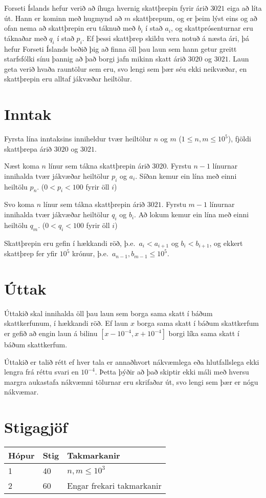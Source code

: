 Forseti Íslands hefur verið að íhuga hvernig skattþrepin fyrir árið $3021$ eiga
að líta út. Hann er kominn með hugmynd að $m$ skattþrepum, og er þeim lýst eins
og að ofan nema að skattþrepin eru táknuð með $b_i$ í stað $a_i$, og
skattprósenturnar eru táknaðar með $q_i$ í stað $p_i$. Ef þessi skattþrep
skildu vera notuð á næsta ári, þá hefur Forseti Íslands beðið þig að finna öll
þau laun sem hann getur greitt starfsfólki sínu þannig að það borgi jafn mikinn
skatt árið $3020$ og $3021$. Laun geta verið hvaða rauntölur sem eru, svo lengi
sem þær séu ekki neikvæðar, en skattþrepin eru alltaf jákvæðar heiltölur.

\section*{Inntak}
Fyrsta lína inntaksins inniheldur tvær heiltölur $n$ og $m$ ($1 \leq n,m \leq
10^5$), fjöldi skattþrepa árið $3020$ og $3021$.

Næst koma $n$ línur sem tákna skattþrepin árið $3020$.
Fyrstu $n - 1$ línurnar innihalda tvær jákvæðar heiltölur $p_i$ og $a_i$.
Síðan kemur ein lína með einni heiltölu $p_n$. ($0 < p_i < 100$ fyrir öll $i$)

Svo koma $n$ línur sem tákna skattþrepin árið $3021$.
Fyrstu $m - 1$ línurnar innihalda tvær jákvæðar heiltölur $q_i$ og $b_i$.
Að lokum kemur ein lína með einni heiltölu $q_m$. ($0 < q_i < 100$ fyrir öll $i$)

Skattþrepin eru gefin í hækkandi röð, þ.e.\ $a_i < a_{i + 1}$ og $b_i < b_{i + 1}$,
og ekkert skattþrep fer yfir $10^5$ krónur, þ.e.\ $a_{n-1}, b_{m-1} \leq 10^5$.

\section*{Úttak}
Úttakið skal innihalda öll þau laun sem borga sama skatt í báðum skattkerfunum, í hækkandi röð.
Ef laun $x$ borga sama skatt í báðum skattkerfum er gefið að engin laun á bilinu $[x - 10^{-4}, x + 10^{-4}]$ borgi líka sama skatt í báðum skattkerfum.

Úttakið er talið rétt ef hver tala er annaðhvort nákvæmlega eða hlutfallslega ekki 
lengra frá réttu svari en $10^{-4}$. Þetta þýðir að það skiptir ekki máli með hversu 
margra aukastafa nákvæmni tölurnar eru skrifaðar út, svo lengi sem þær er nógu nákvæmar.

\section*{Stigagjöf}
\begin{tabular}{|l|l|l|}
\hline
Hópur & Stig & Takmarkanir \\ \hline
1     & 40   & $n,m \leq 10^3$\\ \hline
2     & 60   & Engar frekari takmarkanir\\ \hline
\end{tabular}

